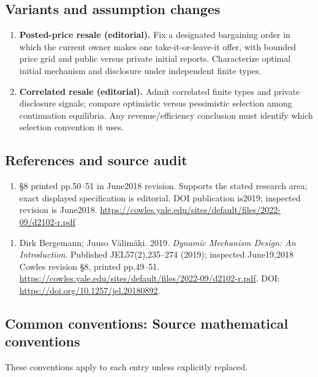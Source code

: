 \documentclass[11pt,a4paper]{article}
\begin{document}
\subsection*{Variants and assumption changes}
\begin{enumerate}
\item \textbf{Posted-price resale (editorial).} Fix a designated bargaining order in which the current owner makes one take-it-or-leave-it offer, with bounded price grid and public versus private initial reports. Characterize optimal initial mechanism and disclosure under independent finite types.
\item \textbf{Correlated resale (editorial).} Admit correlated finite types and private disclosure signals; compare optimistic versus pessimistic selection among continuation equilibria. Any revenue/efficiency conclusion must identify which selection convention it uses.
\end{enumerate}
\subsection*{References and source audit}
\begin{enumerate}
\item §8 printed pp.50–51 in June2018 revision. Supports the stated research area; exact displayed specification is editorial. DOI publication is2019; inspected revision is June2018. \url{https://cowles.yale.edu/sites/default/files/2022-09/d2102-r.pdf}
\end{enumerate}
\begin{enumerate}\raggedright
\item\hypertarget{definitions:source:30007574:1}{} Dirk Bergemann; Juuso Välimäki. 2019. \emph{Dynamic Mechanism Design: An Introduction}. Published JEL57(2),235–274 (2019); inspected June19,2018 Cowles revision §8, printed pp.49–51.
\url{https://cowles.yale.edu/sites/default/files/2022-09/d2102-r.pdf}.
DOI: \url{https://doi.org/10.1257/jel.20180892}.
\end{enumerate}

\subsection*{Common conventions: Source mathematical conventions}

These conventions apply to each entry unless explicitly replaced.
\end{document}
